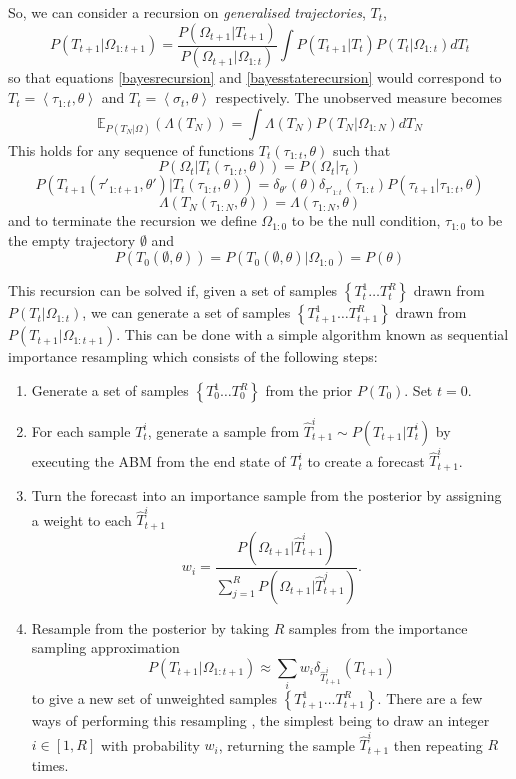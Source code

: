 \documentclass{article}
\begin{document}
\begin{appendices}
So, we can consider a recursion on \textit{generalised trajectories}, $T_t$,
\begin{equation}
P\left(T_{t+1}| \Omega_{1:t+1}\right)
=
\frac{ P(\Omega_{t+1}|T_{t+1})}
{	P(\Omega_{t+1}| \Omega_{1:t}) }
\int P(T_{t+1}|T_t)P\left(T_{t}| \Omega_{1:t}\right) d T_t
\label{generalisedbayesrecursion}
\end{equation}
so that equations \eqref{bayesrecursion} and \eqref{bayesstaterecursion} would correspond to $T_t=\left<\tau_{1:t},\theta\right>$ and $T_t=\left<\sigma_t,\theta\right>$ respectively. The unobserved measure becomes
\begin{equation}
\mathbb{E}_{P(T_N|\Omega)}(\Lambda(T_N)) = \int \Lambda(T_N) P(T_N|\Omega_{1:N}) dT_N
\end{equation}
This holds for any sequence of functions $T_t(\tau_{1:t},\theta)$ such that 
\[
P(\Omega_t|T_t(\tau_{1:t},\theta)) = P(\Omega_t|\tau_t)
\]
\[
P(T_{t+1}(\tau'_{1:t+1},\theta')|T_{t}(\tau_{1:t},\theta)) = \delta_{\theta'}(\theta)\delta_{\tau'_{1:t}}(\tau_{1:t})P(\tau_{t+1}|\tau_{1:t},\theta)
\]
\[
\Lambda(T_N(\tau_{1:N},\theta)) = \Lambda(\tau_{1:N},\theta)
\]
and to terminate the recursion we define $\Omega_{1:0}$ to be the null condition, $\tau_{1:0}$ to be the empty trajectory $\emptyset$ and
\[
P(T_0(\emptyset,\theta)) = P(T_0(\emptyset,\theta)|\Omega_{1:0}) = P(\theta)
\]

This recursion can be solved if, given a set of samples $\left\{T_t^1 \dots T_t^R\right\}$ drawn from $P(T_t|\Omega_{1:t})$, we can generate a set of samples  $\left\{T_{t+1}^1 \dots T_{t+1}^R\right\}$ drawn from $P(T_{t+1}|\Omega_{1:t+1})$. This can be done with a simple algorithm known as sequential importance resampling which consists of the following steps:
\begin{enumerate}
\item Generate a set of samples $\left\{T^1_0 \dots T^R_0\right\}$ from the prior $P(T_0)$. Set $t=0$.

\item For each sample $T_t^i$, generate a sample from $\hat{T}_{t+1}^i \sim P(T_{t+1}|T^i_t)$ by executing the ABM from the end state of $T^i_t$ to create a forecast $\hat{T}_{t+1}^i$.

\item Turn the forecast into an importance sample from the posterior by assigning a weight to each $\hat{T}_{t+1}^i$
\[
w_i = \frac{P(\Omega_{t+1}|\hat{T}_{t+1}^i)}{\sum_{j=1}^R P(\Omega_{t+1}|\hat{T}_{t+1}^j)}.
\]

\item Resample from the posterior by taking $R$ samples from the importance sampling approximation
\begin{equation}
P(T_{t+1}|\Omega_{1:t+1}) \approx  \sum_i w_i\delta_{\hat{T}_{t+1}^i}\left(T_{t+1}\right)
\label{importanceApprox}
\end{equation}
to give a new set of unweighted samples $\left\{T^1_{t+1} \dots T^R_{t+1}\right\}$. There are a few ways of performing this resampling \citep{douc2005comparison}, the simplest being to draw an integer $i\in[1,R]$ with probability $w_i$, returning the sample $\hat{T}_{t+1}^i$ then repeating $R$ times.


\end{enumerate}
\end{appendices}
\end{document}
